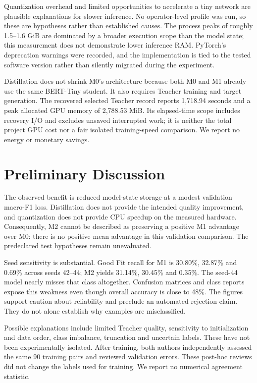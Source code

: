 \documentclass[11pt]{article}
\begin{document}
Quantization overhead and limited opportunities to accelerate a tiny network are plausible explanations for slower inference. No operator-level profile was run, so these are hypotheses rather than established causes. The process peaks of roughly 1.5--1.6 GiB are dominated by a broader execution scope than the model state; this measurement does not demonstrate lower inference RAM. PyTorch's deprecation warnings were recorded, and the implementation is tied to the tested software version rather than silently migrated during the experiment.

Distillation does not shrink M0's architecture because both M0 and M1 already use the same BERT-Tiny student. It also requires Teacher training and target generation. The recovered selected Teacher record reports 1,718.94 seconds and a peak allocated GPU memory of 2,788.53 MiB. Its elapsed-time scope includes recovery I/O and excludes unsaved interrupted work; it is neither the total project GPU cost nor a fair isolated training-speed comparison. We report no energy or monetary savings.

\section{Preliminary Discussion}
The observed benefit is reduced model-state storage at a modest validation macro-F1 loss. Distillation does not provide the intended quality improvement, and quantization does not provide CPU speedup on the measured hardware. Consequently, M2 cannot be described as preserving a positive M1 advantage over M0: there is no positive mean advantage in this validation comparison. The predeclared test hypotheses remain unevaluated.

Seed sensitivity is substantial. Good Fit recall for M1 is 30.80\%, 32.87\% and 0.69\% across seeds 42--44; M2 yields 31.14\%, 30.45\% and 0.35\%. The seed-44 model nearly misses that class altogether. Confusion matrices and class reports expose this weakness even though overall accuracy is close to 48\%. The figures support caution about reliability and preclude an automated rejection claim. They do not alone establish why examples are misclassified.

Possible explanations include limited Teacher quality, sensitivity to initialization and data order, class imbalance, truncation and uncertain labels. These have not been experimentally isolated. After training, both authors independently assessed the same 90 training pairs and reviewed validation errors. These post-hoc reviews did not change the labels used for training. We report no numerical agreement statistic.
\end{document}
